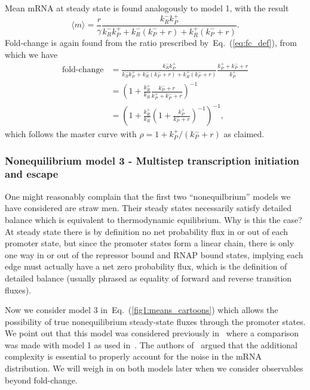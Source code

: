 \documentclass[12pt]{article}%
\newcommand{\eq}[1]{Eq.~(\ref{#1})}
\begin{document}
Mean mRNA at steady state is found analogously to model 1, with the result
\begin{equation}
\langle m\rangle = \frac{r}{\gamma}
        \frac{k_R^- k_P^+}
        {k_R^- k_P^+ + k_R^- (k_P^- + r) + k_R^+ (k_P^- + r)}.
\end{equation}
Fold-change is again found from the ratio prescribed by~\eq{eq:fc_def},
from which we have
\begin{align}
\text{fold-change}
&=      \frac{k_R^- k_P^+}
        {k_R^- k_P^+ + k_R^- (k_P^- + r) + k_R^+ (k_P^- + r)}
        \frac{k_P^+ + k_P^- + r}{k_P^+}
\\
&=      \left(1 + \frac{k_R^+}{k_R^-}
                \frac{k_P^- + r}{k_P^+ + k_P^- + r}
        \right)^{-1}
\\
&=      \left(1 + \frac{k_R^+}{k_R^-}
        \left(1 + \frac{k_P^+}{k_P^- + r}\right)^{-1}
        \right)^{-1},
\end{align}
which follows the master curve with
$\rho = 1 + k_P^+/(k_P^- + r)$ as claimed.

\subsubsection{Nonequilibrium model 3
- Multistep transcription initiation and escape}
One might reasonably complain that the first two
``nonequilbrium'' models we have considered are straw men. Their
steady states necessarily satisfy detailed balance which is
equivalent to thermodynamic equilibrium. Why is this the case? At
steady state there is by definition no net probability flux in or
out of each promoter state, but since the promoter states form a
linear chain, there is only one way in or out of the repressor
bound and RNAP bound states, implying each edge must actually
have a net zero probability flux, which is the definition of
detailed balance (usually phrased as equality of forward and
reverse transition fluxes).

Now we consider model 3 in~\eq{fig1:means_cartoons} which allows
the possibility of true nonequilibrium steady-state fluxes
through the promoter states.
We point out that this model was considered previously in~\cite{Mitarai2015}
where a comparison was made with model 1 as used in~\cite{Jones2014}.
The authors of~\cite{Mitarai2015} argued that the additional
complexity is essential to properly account for the noise in the
mRNA distribution. We will weigh in on both models later when we
consider observables beyond fold-change.
\end{document}
